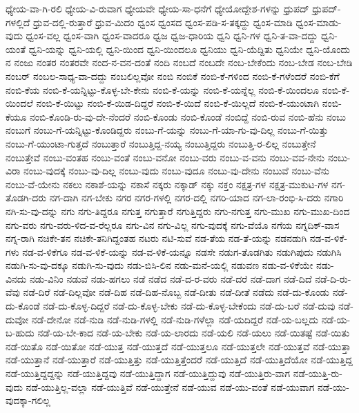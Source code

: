 {ಧ್ಯೇಯ-ವಾ-ಗಿ-ರಲಿ
ಧ್ಯೇಯ-ವಿ-ರುವಾಗ
ಧ್ಯೇಯವೇ
ಧ್ಯೇಯ-ಸಾ-ಧನೆಗೆ
ಧ್ಯೇಯೋದ್ದೇಶ-ಗಳನ್ನು
ಧ್ರುಪದ್
ಧ್ರುಪದ್-ಗಳಲ್ಲಿದೆ
ಧ್ರುವ-ದಲ್ಲಿ-ರುತ್ತಾರೆ
ಧ್ರುವ-ಮಿದಂ
ಧ್ವಂಸ
ಧ್ವಂಸದ
ಧ್ವಂಸ-ಪಡಿ-ಸ-ತಕ್ಕದ್ದು
ಧ್ವಂಸ-ಮಾಡಿ
ಧ್ವಂಸ-ಮಾಡು-ವುದು
ಧ್ವಂಸ-ವಲ್ಲ
ಧ್ವಂಸ-ವಾಗಿ
ಧ್ವಂಸ-ವಾದರೂ
ಧ್ವಜ
ಧ್ವಜ-ಧಾರಿಯ
ಧ್ವನಿ
ಧ್ವನಿ-ಗಳ
ಧ್ವನಿ-ತ-ವಾ-ದದ್ದು
ಧ್ವನಿ-ಯಂತೆ
ಧ್ವನಿ-ಯನ್ನು
ಧ್ವನಿ-ಯಲ್ಲಿ
ಧ್ವನಿ-ಯಿಂದ
ಧ್ವನಿ-ಯಿಂದಲೂ
ಧ್ವನಿಯು
ಧ್ವನಿ-ಯೆದ್ದಿತು
ಧ್ವನಿಯೇ
ಧ್ವನಿ-ಯೊಂದು
ನ
ನಂಜು
ನಂತರ
ನಂತರವೇ
ನಂದ-ನ-ವನ-ದಂತೆ
ನಂದಿ
ನಂಬದೆ
ನಂಬದೇ
ನಂಬ-ಬೇಕೆಂದು
ನಂಬ-ಬೇಡ
ನಂಬ-ಬೇಡಿ
ನಂಬರ್
ನಂಬಲ-ಸಾಧ್ಯ-ವಾ-ದದ್ದು
ನಂಬಲಿಲ್ಲವೋ
ನಂಬಿ
ನಂಬಿಕೆ
ನಂಬಿ-ಕೆ-ಗಳಿಂದ
ನಂಬಿ-ಕೆ-ಗಳೆಂದರೆ
ನಂಬಿ-ಕೆಗೆ
ನಂಬಿ-ಕೆಯ
ನಂಬಿ-ಕೆ-ಯನ್ನಿಟ್ಟು-ಕೊಳ್ಳ-ಬೇ-ಕೇನು
ನಂಬಿ-ಕೆ-ಯನ್ನು
ನಂಬಿ-ಕೆ-ಯನ್ನೆಲ್ಲ
ನಂಬಿ-ಕೆ-ಯಿಂದಲೂ
ನಂಬಿ-ಕೆ-ಯಿಂದಲೆ
ನಂಬಿ-ಕೆ-ಯಿಟ್ಟು
ನಂಬಿ-ಕೆ-ಯಿಡ-ದಿದ್ದರೆ
ನಂಬಿ-ಕೆ-ಯಿದೆ
ನಂಬಿ-ಕೆ-ಯಿಲ್ಲದೆ
ನಂಬಿ-ಕೆ-ಯುಂಟಾಗಿ
ನಂಬಿ-ಕೆಯೂ
ನಂಬಿ-ಕೊಂಡಿ-ರು-ವು-ದೇ-ನೆಂದರೆ
ನಂಬಿ-ಕೊಂಡು
ನಂಬಿ-ಕೊಂಡೆ
ನಂಬಿದ್ದೆ
ನಂಬಿ-ರುವ
ನಂಬಿ-ಹೆನು
ನಂಬು
ನಂಬುಗೆ
ನಂಬು-ಗೆ-ಯನ್ನಿಟ್ಟು-ಕೊಂಡಿದ್ದರು
ನಂಬು-ಗೆ-ಯನ್ನು
ನಂಬು-ಗೆ-ಯಾ-ಗು-ವು-ದಿಲ್ಲ
ನಂಬು-ಗೆ-ಯಿತ್ತು
ನಂಬು-ಗೆ-ಯುಂಟಾ-ಗುತ್ತದೆ
ನಂಬುತ್ತಾರೆ
ನಂಬುತ್ತಿದ್ದ-ನಯ್ಯ
ನಂಬುತ್ತಿದ್ದರು
ನಂಬುತ್ತಿ-ರ-ಲಿಲ್ಲ
ನಂಬುತ್ತೇನೆ
ನಂಬುತ್ತೇವೆ
ನಂಬು-ವಂತಹ
ನಂಬು-ವಂತೆ
ನಂಬು-ವನೋ
ನಂಬು-ವರು
ನಂಬು-ವ-ವನು
ನಂಬು-ವವ-ನೇನು
ನಂಬು-ವಿರಾ
ನಂಬು-ವುದಕ್ಕೆ
ನಂಬು-ವು-ದಿಲ್ಲ
ನಂಬು-ವುದು
ನಂಬು-ವುದೂ
ನಂಬು-ವು-ದೇನು
ನಂಬುವೆ
ನಂಬು-ವೆನು
ನಂಬು-ವೆ-ಯೇನು
ನಕಲು
ನಕಾಶೆ-ಯನ್ನು
ನಕಾಸೆ
ನಕ್ಕರು
ನಕ್ಕಾಡ್
ನಕ್ಕು
ನಕ್ತಂ
ನಕ್ಷತ್ರ-ಗಳ
ನಕ್ಷತ್ರ-ಮುಕುಟ-ಗಳ
ನಗ-ತೊಡಗಿ-ದರು
ನಗ-ದಾಗಿ
ನಗ-ಬೇಕು
ನಗರ
ನಗರ-ಗಳಲ್ಲಿ
ನಗರ-ದಲ್ಲಿ
ನಗರಿ-ಯಾದ
ನಗ-ಲಾ-ರಂಭಿ-ಸಿ-ದರು
ನಗಾರಿ
ನಗಿ-ಸು-ವು-ದನ್ನು
ನಗು
ನಗು-ತಿದ್ದರೂ
ನಗುತ್ತ
ನಗುತ್ತಾರೆ
ನಗುತ್ತಿದ್ದರು
ನಗು-ನಗುತ್ತ
ನಗು-ಮುಖ
ನಗು-ಮುಖ-ದಿಂದ
ನಗು-ವರು
ನಗು-ವರು-ಳಿದ-ವ-ರೆಲ್ಲರೂ
ನಗು-ವಿನ
ನಗು-ವಿಲ್ಲ
ನಗು-ವುದಕ್ಕೆ
ನಗು-ವೆಯೊ
ನಗೆಯ
ನಗ್ನದಿಕ್-ವಾಸ
ನಗ್ನ-ರಾಗಿ
ನಚಿಕೇ-ತನ
ನಚಿಕೇ-ತನಿಗಿದ್ದಂತಹ
ನಟರು
ನಟಿ-ಸುವೆ
ನಡ-ತೆಯ
ನಡ-ತೆ-ಯನ್ನು
ನಡನಡುಗಿ
ನಡ-ವ-ಳಿಕೆ-ಗಳು
ನಡ-ವ-ಳಿಕೆಗೂ
ನಡ-ವ-ಳಿಕೆ-ಯನ್ನು
ನಡ-ವ-ಳಿಕೆ-ಯನ್ನೂ
ನಡಸೇ
ನಡುಗ-ತೊಡಗಿತು
ನಡುಗಿಪುದು
ನಡುಗಿಸಿ
ನಡುಗಿ-ಸು-ವು-ದಕ್ಕೂ
ನಡುಗಿ-ಸು-ವುದು
ನಡು-ಬಿಸಿ-ಲಿನ
ನಡು-ಮನೆ-ಯಲ್ಲಿ
ನಡುವಣ
ನಡು-ವ-ಳಿಕೆಯೇ
ನಡು-ವಿನದು
ನಡು-ವಿನಿಂ
ನಡುವೆ
ನಡು-ಹಗಲು
ನಡೆ
ನಡೆದ
ನಡೆ-ದ-ರ-ವರು
ನಡೆ-ದರೆ
ನಡೆ-ದಾಗ
ನಡೆ-ದಿದೆ
ನಡೆ-ದಿ-ರು-ವೆವು
ನಡೆ-ದಿರೆ
ನಡೆ-ದಿಲ್ಲವೋ
ನಡೆ-ದಿಹ
ನಡೆ-ದಿಹ-ನೊಬ್ಬ
ನಡೆ-ದೀತು
ನಡೆ-ದೀತೆ
ನಡೆದು
ನಡೆ-ದು-ಕೊಂಡು
ನಡೆ-ದು-ಕೊಂಡೆ
ನಡೆ-ದು-ಕೊಳ್ಳ-ದಿದ್ದರೆ
ನಡೆ-ದು-ಕೊಳ್ಳ-ಬೇಕು
ನಡೆ-ದು-ಕೊಳ್ಳ-ಬೇಕೆಂದು
ನಡೆ-ದು-ಬರೆ
ನಡೆ-ದುವು
ನಡೆ-ದುವೋ
ನಡೆ-ದೇನೋ
ನಡೆ-ನುಡಿ
ನಡೆ-ನುಡಿ-ಗಳಲ್ಲಿ
ನಡೆ-ನುಡಿ-ಗಳೆಲ್ಲಾ
ನಡೆ-ಯದಿದ್ದರೆ
ನಡೆ-ಯ-ಬಲ್ಲದು
ನಡೆ-ಯ-ಬ-ಹುದು
ನಡೆ-ಯ-ಬೇ-ಕಾದ
ನಡೆ-ಯ-ಬೇಕು
ನಡೆ-ಯ-ಲಾರದು
ನಡೆ-ಯಲಿ
ನಡೆ-ಯಲು
ನಡೆ-ಯಿತಷ್ಟೆ
ನಡೆ-ಯಿತು
ನಡೆ-ಯಿತೊ
ನಡೆ-ಯಿತೋ
ನಡೆ-ಯುತ್ತ
ನಡೆ-ಯುತ್ತದೆ
ನಡೆ-ಯುತ್ತಲೂ
ನಡೆ-ಯುತ್ತಲೇ
ನಡೆ-ಯುತ್ತವೆ
ನಡೆ-ಯುತ್ತಾ
ನಡೆ-ಯುತ್ತಾನೆ
ನಡೆ-ಯುತ್ತಾರೆ
ನಡೆ-ಯುತ್ತಿತ್ತು
ನಡೆ-ಯುತ್ತಿತ್ತೆಂದರೆ
ನಡೆ-ಯುತ್ತಿದೆ
ನಡೆ-ಯುತ್ತಿದೆಯೋ
ನಡೆ-ಯುತ್ತಿದ್ದ
ನಡೆ-ಯುತ್ತಿದ್ದದ್ದನ್ನು
ನಡೆ-ಯುತ್ತಿದ್ದವು
ನಡೆ-ಯುತ್ತಿದ್ದಾಗ
ನಡೆ-ಯುತ್ತಿದ್ದುವು
ನಡೆ-ಯುತ್ತಿರು-ವಾಗ
ನಡೆ-ಯುತ್ತಿ-ರು-ವುದು
ನಡೆ-ಯುತ್ತಿಲ್ಲ-ವಲ್ಲಾ
ನಡೆ-ಯುತ್ತಿವೆ
ನಡೆ-ಯುತ್ತೇನೆ
ನಡೆ-ಯುವ
ನಡೆ-ಯು-ವಂತೆ
ನಡೆ-ಯುವಾಗ
ನಡೆ-ಯು-ವುದಕ್ಕಾ-ಗಲಿಲ್ಲ
}
